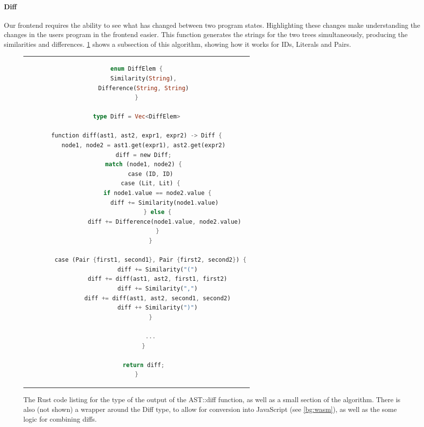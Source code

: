 
\paragraph{Diff} \label{paragraph:diff} Our frontend requires the ability to see what has changed between two program states. Highlighting these changes make understanding the changes in the users program in the frontend easier. This function generates the strings for the two trees simultaneously, producing the similarities and differences. \ref{fig:diff_list} shows a subsection of this algorithm, showing how it works for IDs, Literals and Pairs.

\begin{figure}[h]
    \centering
    \begin{tabular}{c}
    \begin{lstlisting}[language=Rust]
enum DiffElem {
    Similarity(String),
    Difference(String, String)
}

type Diff = Vec<DiffElem>

function diff(ast1, ast2, expr1, expr2) -> Diff {
    node1, node2 = ast1.get(expr1), ast2.get(expr2)
    diff = new Diff;
    match (node1, node2) {
        case (ID, ID)
        case (Lit, Lit) {
            if node1.value == node2.value {
                diff += Similarity(node1.value)
            } else {
                diff += Difference(node1.value, node2.value)
            }
        }

        case (Pair {first1, second1}, Pair {first2, second2}) {
            diff += Similarity("(")
            diff += diff(ast1, ast2, first1, first2)
            diff += Similarity(",")
            diff += diff(ast1, ast2, second1, second2)
            diff ++ Similarity(")")
        }

        ...
    }
    
    return diff;
}
    \end{lstlisting}
    \end{tabular}
    \caption{The Rust code listing for the type of the output of the AST::diff function, as well as a small section of the algorithm. There is also (not shown) a wrapper around the Diff type, to allow for conversion into JavaScript (see \ref{bg:wasm}), as well as the some logic for combining diffs.}
    \label{fig:diff_list}
\end{figure}

